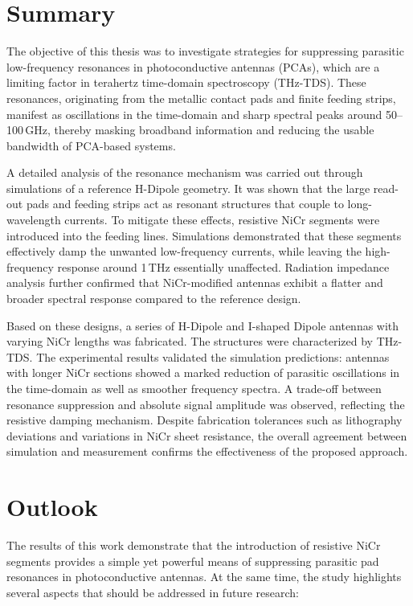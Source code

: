 \section{Summary}

\noindent
The objective of this thesis was to investigate strategies for suppressing parasitic low-frequency resonances in
photoconductive antennas (PCAs), which are a limiting factor in terahertz time-domain spectroscopy (THz-TDS).
These resonances, originating from the metallic contact pads and finite feeding strips, manifest as oscillations
in the time-domain and sharp spectral peaks around 50–100\,GHz, thereby masking broadband information
and reducing the usable bandwidth of PCA-based systems.

\noindent
A detailed analysis of the resonance mechanism was carried out through simulations of a reference H-Dipole
geometry. It was shown that the large read-out pads and feeding strips act as resonant structures that couple to
long-wavelength currents. To mitigate these effects, resistive NiCr segments were introduced into the feeding
lines. Simulations demonstrated that these segments effectively damp the unwanted low-frequency currents,
while leaving the high-frequency response around 1\,THz essentially unaffected. Radiation impedance analysis
further confirmed that NiCr-modified antennas exhibit a flatter and broader spectral response compared to the
reference design.

\noindent
Based on these designs, a series of H-Dipole and I-shaped Dipole antennas with varying NiCr lengths was
fabricated. The structures were characterized by THz-TDS. The experimental results validated the simulation
predictions: antennas with longer NiCr sections showed a marked reduction of parasitic oscillations in the
time-domain as well as smoother frequency spectra. A trade-off between resonance suppression and absolute
signal amplitude was observed, reflecting the resistive damping mechanism. Despite fabrication tolerances
such as lithography deviations and variations in NiCr sheet resistance, the overall agreement between
simulation and measurement confirms the effectiveness of the proposed approach.

\section{Outlook}

\noindent
The results of this work demonstrate that the introduction of resistive NiCr segments provides a simple yet
powerful means of suppressing parasitic pad resonances in photoconductive antennas. At the same time, the
study highlights several aspects that should be addressed in future research:

